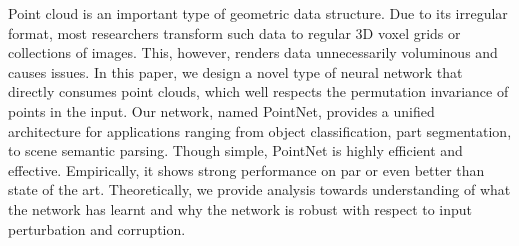 
Point cloud is an important type of geometric data structure. Due to its irregular format, most researchers transform such data to regular 3D voxel grids or collections of images. This, however, renders data unnecessarily voluminous and causes issues. In this paper, we design a novel type of neural network that directly consumes point clouds, which well respects the permutation invariance of points in the input.  Our network, named PointNet, provides a unified architecture for applications ranging from object classification, part segmentation, to scene semantic parsing. Though simple, PointNet is highly efficient and effective. Empirically, it shows strong performance on par or even better than state of the art. Theoretically, we provide analysis towards understanding of what the network has learnt and why the network is robust with respect to input perturbation and corruption.



   
